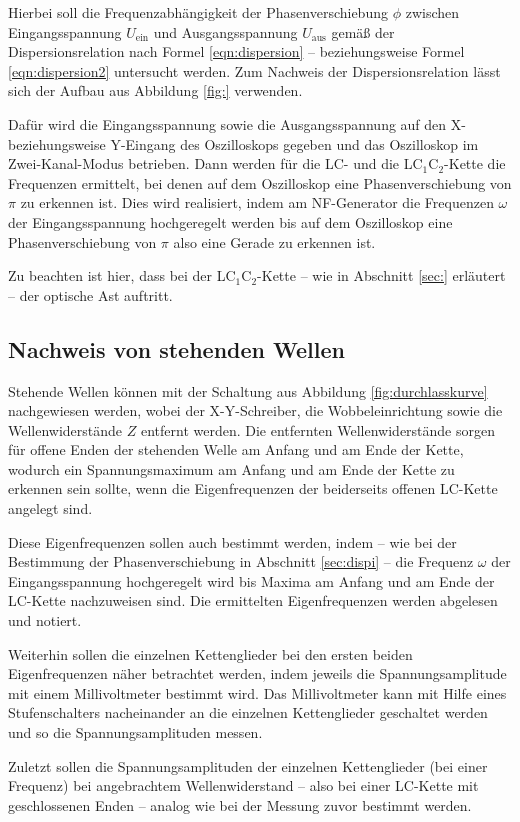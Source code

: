 Hierbei soll die Frequenzabhängigkeit der Phasenverschiebung $\phi$ 
zwischen Eingangsspannung $U_{\text{ein}}$ und Ausgangsspannung $U_{\text{aus}}$ gemäß der Dispersionsrelation nach Formel \eqref{eqn:dispersion}
-- beziehungsweise Formel \eqref{eqn:dispersion2} untersucht werden.
Zum Nachweis der Dispersionsrelation lässt sich der Aufbau aus Abbildung 
\ref{fig:} verwenden.

Dafür wird die Eingangsspannung sowie die Ausgangsspannung auf den X- beziehungsweise Y-Eingang 
des Oszilloskops gegeben und das Oszilloskop im Zwei-Kanal-Modus betrieben.
Dann werden für die LC- und die LC$_1$C$_2$-Kette die Frequenzen ermittelt, bei denen auf 
dem Oszilloskop eine Phasenverschiebung von $\pi$ zu erkennen ist.
Dies wird realisiert, indem am NF-Generator die Frequenzen $\omega$ der Eingangsspannung 
hochgeregelt werden bis auf dem Oszilloskop eine Phasenverschiebung von $\pi$ also eine 
Gerade zu erkennen ist.

Zu beachten ist hier, dass bei der LC$_1$C$_2$-Kette -- wie in Abschnitt \ref{sec:} erläutert 
-- der optische Ast auftritt.


\subsection{Nachweis von stehenden Wellen}

Stehende Wellen können mit der Schaltung aus Abbildung \ref{fig:durchlasskurve} nachgewiesen 
werden, wobei der X-Y-Schreiber, die Wobbeleinrichtung sowie die Wellenwiderstände $Z$ entfernt 
werden. Die entfernten Wellenwiderstände sorgen für offene Enden der stehenden Welle am Anfang
und am Ende der Kette, wodurch ein Spannungsmaximum am Anfang und am Ende der Kette zu erkennen
sein sollte, wenn die Eigenfrequenzen der beiderseits offenen LC-Kette angelegt sind.

Diese Eigenfrequenzen sollen auch bestimmt werden, indem -- wie bei der Bestimmung der Phasenverschiebung in Abschnitt \ref{sec:dispi} -- die Frequenz $\omega$ der Eingangsspannung hochgeregelt wird bis Maxima am Anfang und am Ende der LC-Kette nachzuweisen sind. Die ermittelten Eigenfrequenzen werden abgelesen und notiert.

Weiterhin sollen die einzelnen Kettenglieder bei den ersten beiden Eigenfrequenzen näher betrachtet werden, indem jeweils die Spannungsamplitude mit einem Millivoltmeter bestimmt wird.
Das Millivoltmeter kann mit Hilfe eines Stufenschalters nacheinander an die einzelnen 
Kettenglieder geschaltet werden und so die Spannungsamplituden messen.

Zuletzt sollen die Spannungsamplituden der einzelnen Kettenglieder (bei einer Frequenz) bei angebrachtem Wellenwiderstand -- also bei einer LC-Kette mit geschlossenen Enden -- analog wie bei der Messung zuvor bestimmt werden.







